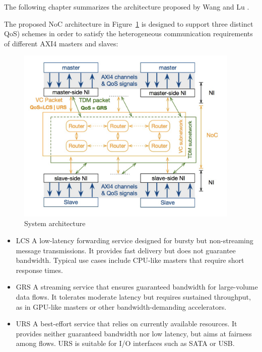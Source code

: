 The following chapter summarizes the architecture proposed by Wang and Lu \cite{wang_flexible_2022}.

The proposed NoC architecture in Figure~\ref{fig:System_Architecture} is designed to support three distinct \ac{QoS}) schemes in order to satisfy the heterogeneous communication requirements of different \ac{AXI4} masters and slaves:

\begin{figure}[htbp]
    \centering
    \includegraphics[width=0.95\textwidth]{img/System Architecture.png}
    \caption{System architecture}
    \label{fig:System_Architecture}
\end{figure}

\begin{itemize}
    \item \ac{LCS} A low-latency forwarding service designed for bursty but non-streaming message transmissions. It provides fast delivery but does not guarantee bandwidth. Typical use cases include CPU-like masters that require short response times.
    \item \ac{GRS} A streaming service that ensures guaranteed bandwidth for large-volume data flows. It tolerates moderate latency but requires sustained throughput, as in GPU-like masters or other bandwidth-demanding accelerators.
    \item \ac{URS} A best-effort service that relies on currently available resources. It provides neither guaranteed bandwidth nor low latency, but aims at fairness among flows. URS is suitable for I/O interfaces such as SATA or USB.
\end{itemize}

